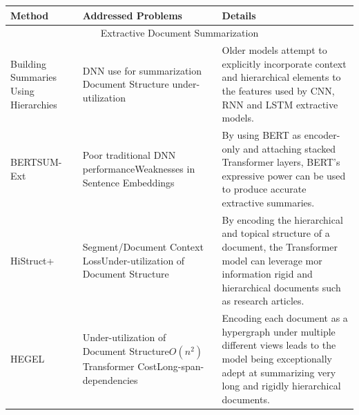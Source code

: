 \documentclass[preprint,review,12pt]{elsarticle}
\begin{document}
    
    \begin{table}[H]
        \scriptsize
        \begin{tabular}
             { |p{3cm}|p{3cm}|p{9cm}|  }
             \hline
             \textbf{Method} & \textbf{Addressed Problems} & \textbf{Details}\\
            \hline
            
             \multicolumn{3}{|c|}{Extractive Document Summarization} \\
             \hline
             Building Summaries Using Hierarchies \cite{lapata, nallapati, xiao} & DNN use for summarization  \break\break Document Structure under-utilization & Older models attempt to explicitly incorporate context and hierarchical elements to the features used by CNN, RNN and LSTM extractive models. \\
             \hline
             BERTSUM-Ext \cite{nallapati2} & Poor traditional DNN performance\break\break Weaknesses in Sentence Embeddings & By using BERT as encoder-only and attaching stacked Transformer layers, BERT's expressive power can be used to produce accurate extractive summaries.\\  
             \hline
             HiStruct+ \cite{histruct} & Segment/Document Context Loss\break\break Under-utilization of Document Structure & By encoding the hierarchical and topical structure of a document, the Transformer model can leverage mor information rigid and hierarchical documents such as research articles.\\
             \hline
             HEGEL \cite{hegel} & Under-utilization of Document Structure\break\break $O(n^2)$ Transformer Cost\break\break Long-span-dependencies & Encoding each document as a hypergraph under multiple different views leads to the model being exceptionally adept at summarizing very long and rigidly hierarchical documents.\\
             \hline


\end{tabular}
\end{table}
\end{document}
